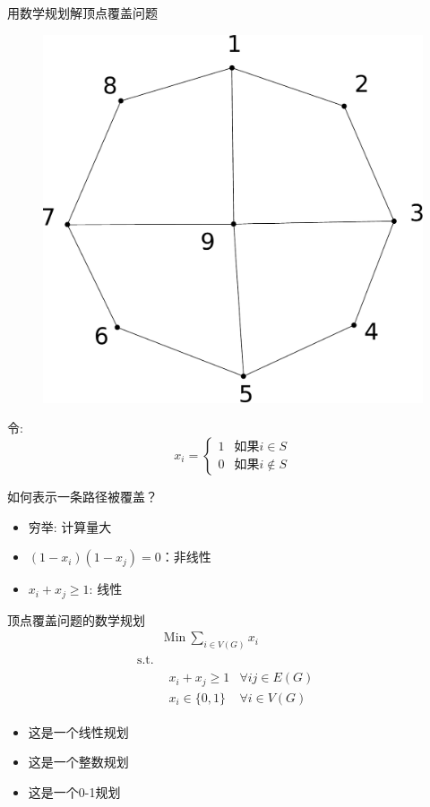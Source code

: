 \documentclass[UTF8]{ctexbeamer}
\begin{document}
\begin{frame}{用数学规划解顶点覆盖问题}
  \begin{figure}
    \centering
    \includegraphics[width=.4\textwidth]{city.pdf}
  \end{figure}
  
  令:
  \[
  x_i =\left\{
  \begin{array}{cc}
    1 & \text{如果} i \in S\\
    0 & \text{如果} i \notin S
  \end{array}
  \right.
  \]
\end{frame}

\begin{frame}{如何表示一条路径被覆盖？}
  \begin{itemize}
  \item<1-> 穷举: 计算量大
  \item<2-> $(1-x_i)(1-x_j) = 0$：非线性
  \item<3-> $x_i+x_j \ge 1$: 线性
  \end{itemize}
\end{frame}

\begin{frame}{顶点覆盖问题的数学规划}
  \[ 
  \begin{array}{lcl}
    & \mbox{Min}\ \sum_{i \in V(G)} x_i & \\
    \mbox{s.t.} & &  \\
    &
    \begin{array}{cc}
      x_i+x_j \ge 1 & \forall ij \in E(G)\\
      x_i \in \{0, 1\} & \forall i \in V(G)
    \end{array}
    &
  \end{array}
  \]

  \begin{itemize}
  \item 这是一个线性规划
  \item 这是一个整数规划
  \item 这是一个0-1规划
  \end{itemize}

\end{frame}
\end{document}
